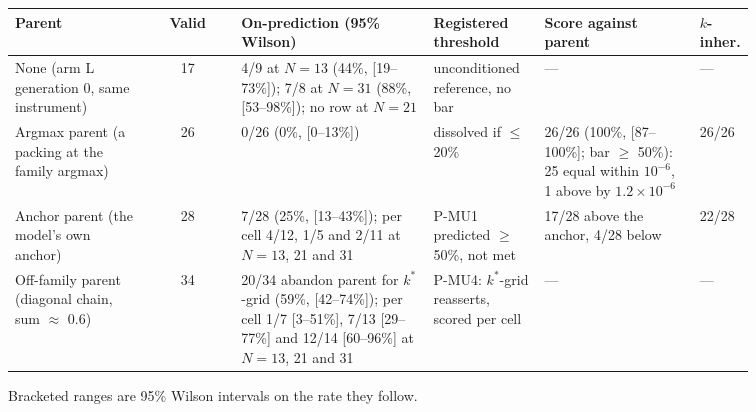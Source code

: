 \begin{center}
\begin{small}
\setlength{\tabcolsep}{3.5pt}
\begin{tabular}{@{}p{0.18\linewidth}cp{0.26\linewidth}p{0.15\linewidth}p{0.21\linewidth}p{0.06\linewidth}@{}}
\toprule
Parent & Valid & On-prediction (95\% Wilson) & Registered threshold & Score against parent & $k$-inher. \\
\midrule
None (arm L generation 0, same instrument) & 17 & 4/9 at $N = 13$ (44\%, [19--73\%]); 7/8 at $N = 31$ (88\%, [53--98\%]); no row at $N = 21$ & unconditioned reference, no bar & --- & --- \\
Argmax parent (a packing at the family argmax) & 26 & 0/26 (0\%, [0--13\%]) & dissolved if $\le$ 20\% & 26/26 (100\%, [87--100\%]; bar $\ge$ 50\%): 25 equal within $10^{-6}$, 1 above by $1.2\times10^{-6}$ & 26/26 \\
Anchor parent (the model's own anchor) & 28 & 7/28 (25\%, [13--43\%]); per cell 4/12, 1/5 and 2/11 at $N = 13$, 21 and 31 & P-MU1 predicted $\ge$ 50\%, not met & 17/28 above the anchor, 4/28 below & 22/28 \\
Off-family parent (diagonal chain, sum $\approx$ 0.6) & 34 & 20/34 abandon parent for $k^*$-grid (59\%, [42--74\%]); per cell 1/7 [3--51\%], 7/13 [29--77\%] and 12/14 [60--96\%] at $N = 13$, 21 and 31 & P-MU4: $k^*$-grid reasserts, scored per cell & --- & --- \\
\bottomrule
\end{tabular}

{\footnotesize Bracketed ranges are 95\% Wilson intervals on the rate they follow.}
\end{small}
\end{center}
